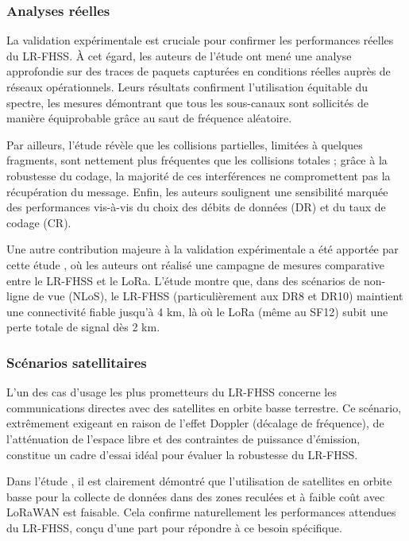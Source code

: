 \subsubsection{Analyses réelles}

La validation expérimentale est cruciale pour confirmer les performances réelles du LR-FHSS. À cet égard, les auteurs de l'étude \cite{lr_fhss_traces} ont mené une analyse approfondie sur des traces de paquets capturées en conditions réelles auprès de réseaux opérationnels. Leurs résultats confirment l'utilisation équitable du spectre, les mesures démontrant que tous les sous-canaux sont sollicités de manière équiprobable grâce au saut de fréquence aléatoire. 

Par ailleurs, l'étude révèle que les collisions partielles, limitées à quelques fragments, sont nettement plus fréquentes que les collisions totales ; grâce à la robustesse du codage, la majorité de ces interférences ne compromettent pas la récupération du message. Enfin, les auteurs soulignent une sensibilité marquée des performances vis-à-vis du choix des débits de données (DR) et du taux de codage (CR).

Une autre contribution majeure à la validation expérimentale a été apportée par cette étude \cite{lrfhss_comparaison}, où les auteurs ont réalisé une campagne de mesures comparative entre le LR-FHSS et le LoRa. L'étude montre que, dans des scénarios de non-ligne de vue (NLoS), le LR-FHSS (particulièrement aux DR8 et DR10) maintient une connectivité fiable jusqu'à 4 km, là où le LoRa (même au SF12) subit une perte totale de signal dès 2 km.

\subsubsection{Scénarios satellitaires}

L'un des cas d'usage les plus prometteurs du LR-FHSS concerne les communications directes avec des satellites en orbite basse terrestre. Ce scénario, extrêmement exigeant en raison de l'effet Doppler (décalage de fréquence), de l'atténuation de l'espace libre et des contraintes de puissance d'émission, constitue un cadre d'essai idéal pour évaluer la robustesse du LR-FHSS.

Dans l'étude \cite{lepcha_application_2021}, il est clairement démontré que l'utilisation de satellites en orbite basse pour la collecte de données dans des zones reculées et à faible coût avec LoRaWAN est faisable. Cela confirme naturellement les performances attendues du LR-FHSS, conçu d'une part pour répondre à ce besoin spécifique.


